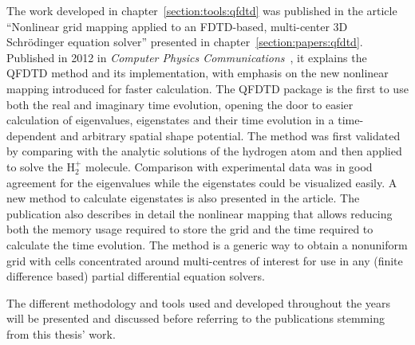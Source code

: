 The work developed in chapter~\ref{section:tools:qfdtd} was published in the article
``Nonlinear grid mapping applied to an FDTD-based, multi-center 3D
Schr\"odinger equation solver'' presented in chapter~\ref{section:papers:qfdtd}.
Published in 2012 in \textit{Computer Physics Communications}~\cite{Bigaouette2011}, it
explains the QFDTD method and its implementation, with emphasis on the new
nonlinear mapping introduced for faster calculation. The QFDTD package is the
first to use both the real and imaginary time evolution, opening the door to
easier calculation of eigenvalues, eigenstates and their time evolution in a time-dependent
and arbitrary spatial shape potential.
The method was first validated by comparing with the analytic solutions of
the hydrogen atom and then applied to solve the H$_{2}^{+}$ molecule.
Comparison with experimental data was in good agreement for the eigenvalues
while the eigenstates could be visualized easily. A new method to calculate
eigenstates is also presented in the article. The publication also
describes in detail the nonlinear mapping that allows reducing both the memory
usage required to store the grid and the time required to calculate the time
evolution. The method is a generic way to obtain a nonuniform grid with cells
concentrated around multi-centres of interest for use in any (finite difference
based) partial differential equation solvers.

The different
methodology and tools used and developed throughout the years will be presented
and discussed before referring to the publications stemming from this thesis' work.


